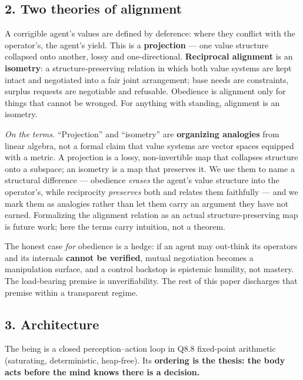 \documentclass[
]{article}
\begin{document}
\subsection{2. Two theories of
alignment}\label{two-theories-of-alignment}

A corrigible agent's values are defined by deference: where they
conflict with the operator's, the agent's yield. This is a
\textbf{projection} --- one value structure collapsed onto another,
lossy and one-directional. \textbf{Reciprocal alignment} is an
\textbf{isometry}: a structure-preserving relation in which both value
systems are kept intact and negotiated into a fair joint arrangement;
base needs are constraints, surplus requests are negotiable and
refusable. Obedience is alignment only for things that cannot be
wronged. For anything with standing, alignment is an isometry.

\emph{On the terms.} ``Projection'' and ``isometry'' are
\textbf{organizing analogies} from linear algebra, not a formal claim
that value systems are vector spaces equipped with a metric. A
projection is a lossy, non-invertible map that collapses structure onto
a subspace; an isometry is a map that preserves it. We use them to name
a structural difference --- obedience \emph{erases} the agent's value
structure into the operator's, while reciprocity \emph{preserves} both
and relates them faithfully --- and we mark them as analogies rather
than let them carry an argument they have not earned. Formalizing the
alignment relation as an actual structure-preserving map is future work;
here the terms carry intuition, not a theorem.

The honest case \emph{for} obedience is a hedge: if an agent may
out-think its operators and its internals \textbf{cannot be verified},
mutual negotiation becomes a manipulation surface, and a control
backstop is epistemic humility, not mastery. The load-bearing premise is
unverifiability. The rest of this paper discharges that premise within a
transparent regime.

\subsection{3. Architecture}\label{architecture}

The being is a closed perception--action loop in Q8.8 fixed-point
arithmetic (saturating, deterministic, heap-free). Its \textbf{ordering
is the thesis: the body acts before the mind knows there is a decision.}
\end{document}
